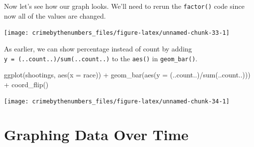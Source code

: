 \documentclass[
  12pt,
  openany]{book}
\newenvironment{Shaded}{\begin{snugshade}}{\end{snugshade}}
\newcommand{\AttributeTok}[1]{\textcolor[rgb]{0.61,0.61,0.61}{#1}}
\newcommand{\ConstantTok}[1]{\textcolor[rgb]{0,0,0}{#1}}
\newcommand{\FunctionTok}[1]{\textcolor[rgb]{0,0,0}{#1}}
\newcommand{\NormalTok}[1]{#1}
\newcommand{\OtherTok}[1]{\textcolor[rgb]{0.37,0.37,0.37}{#1}}
\newcommand{\SpecialCharTok}[1]{\textcolor[rgb]{0,0,0}{#1}}
\begin{document}
Now let's see how our graph looks. We'll need to rerun the \texttt{factor()} code since now all of the values are changed.

\begin{Shaded}
\end{Shaded}

\begin{center}\texttt{[image: crimebythenumbers\_files/figure-latex/unnamed-chunk-33-1]} \end{center}

As earlier, we can show percentage instead of count by adding \texttt{y\ =\ (..count..)/sum(..count..)} to the \texttt{aes()} in \texttt{geom\_bar()}.

\begin{Shaded}
\begin{Highlighting}[]
\FunctionTok{ggplot}\NormalTok{(shootings, }\FunctionTok{aes}\NormalTok{(}\AttributeTok{x =}\NormalTok{ race)) }\SpecialCharTok{+} 
  \FunctionTok{geom\_bar}\NormalTok{(}\FunctionTok{aes}\NormalTok{(}\AttributeTok{y =}\NormalTok{ (..count..)}\SpecialCharTok{/}\FunctionTok{sum}\NormalTok{(..count..))) }\SpecialCharTok{+}
  \FunctionTok{coord\_flip}\NormalTok{() }
\end{Highlighting}
\end{Shaded}

\begin{center}\texttt{[image: crimebythenumbers\_files/figure-latex/unnamed-chunk-34-1]} \end{center}

\hypertarget{graphing-data-over-time}{%
\section{Graphing Data Over Time}\label{graphing-data-over-time}}
\end{document}
